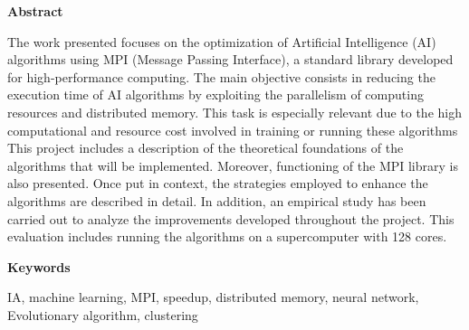 
\newpage

\thispagestyle{empty}

\begin{center}

{\bf \Huge Abstract}

  \end{center}
\vspace{1cm}

The work presented focuses on the optimization of Artificial Intelligence (AI) algorithms using MPI (Message Passing Interface), a standard library developed for high-performance computing.
The main objective consists in reducing the execution time of AI algorithms by exploiting the parallelism of computing resources and distributed memory. This task is especially relevant due to the high computational and resource cost involved in training or running these algorithms
This project includes a description of the theoretical foundations of the algorithms that will be implemented. Moreover, functioning of the MPI library is also presented.
Once put in context, the strategies employed to enhance the algorithms are described in detail.
In addition, an empirical study has been carried out to analyze the improvements developed throughout the project. This evaluation includes running the algorithms on a supercomputer with 128 cores.


\vspace{1cm}


\begin{center}

{\bf \Large Keywords}

   \end{center}

   \vspace{0.5cm}
   
IA, machine learning, MPI, speedup, distributed memory, neural network, Evolutionary algorithm, clustering
   


